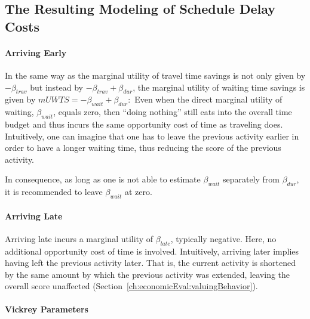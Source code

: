 
\subsection{The Resulting Modeling of Schedule Delay Costs}
\label{sec:schedule-delay-costs}

\paragraph{Arriving Early}

In the same way as the marginal utility of travel time savings is not only given by $- \beta_{trav}$ but instead by $- \beta_{trav} + \beta_{dur}$, the marginal utility of waiting time savings is given by 
$
mUWTS = - \beta_{wait} + \beta_{dur}: 
$
Even when the direct marginal utility of waiting, $\beta_{wait}$, equals zero, then ``doing nothing'' still eats into the overall time budget and thus incurs the same opportunity cost of time as traveling does.  
%
Intuitively, one can imagine that one has to leave the previous activity earlier in order to have a longer waiting time, thus reducing the score of the previous activity.

In consequence, as long as one is not able to estimate $\beta_{wait}$ separately from $\beta_{dur}$, it is recommended to leave $\beta_{wait}$ at zero.

\paragraph{Arriving Late}

Arriving late incurs a marginal utility of $\beta_{late}$, typically negative.  Here, no additional opportunity cost of time is involved. Intuitively, arriving later implies having left the previous activity later.  That is, the current activity is shortened by the same amount by which the previous activity was extended, leaving the overall score unaffected (\cf Section~\ref{ch:economicEval:valuingBehavior}). 

\paragraph{Vickrey Parameters}

